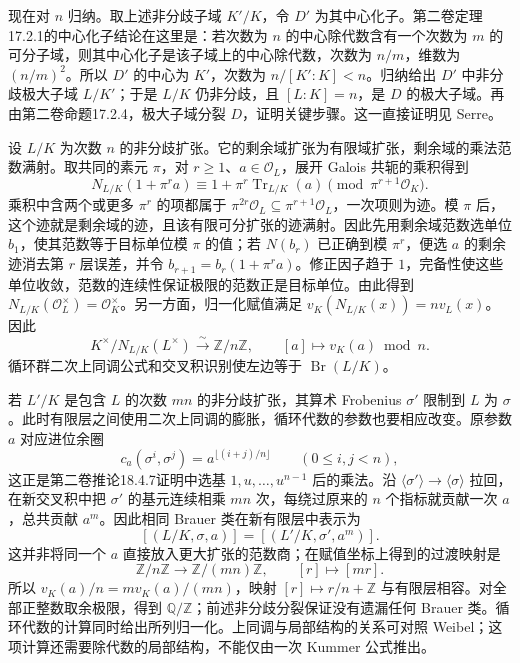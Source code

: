 \begin{proofsketch}
	现在对 \(n\) 归纳。取上述非分歧子域 \(K'/K\)，令 \(D'\) 为其中心化子。第二卷定理17.2.1的中心化子结论在这里是：若次数为 \(n\) 的中心除代数含有一个次数为 \(m\) 的可分子域，则其中心化子是该子域上的中心除代数，次数为 \(n/m\)，维数为 \((n/m)^2\)。所以 \(D'\) 的中心为 \(K'\)，次数为 \(n/[K':K]<n\)。归纳给出 \(D'\) 中非分歧极大子域 \(L/K'\)；于是 \(L/K\) 仍非分歧，且 \([L:K]=n\)，是 \(D\) 的极大子域。再由第二卷命题17.2.4，极大子域分裂 \(D\)，证明关键步骤。这一直接证明见 Serre\cite[Chapter XII, Section 2, Proposition 1, Lemma 1 and Proposition 2, pp. 182--184]{Serre1979LocalFields}。

	设 \(L/K\) 为次数 \(n\) 的非分歧扩张。它的剩余域扩张为有限域扩张，剩余域的乘法范数满射。取共同的素元 \(\pi\)，对 \(r\ge1\)、\(a\in\mathcal O_L\)，展开 Galois 共轭的乘积得到
	\[
		N_{L/K}(1+\pi^r a) \equiv1+\pi^r\operatorname{Tr}_{L/K}(a) \pmod{\pi^{r+1}\mathcal O_K}.
	\]
	乘积中含两个或更多 \(\pi^r\) 的项都属于 \(\pi^{2r}\mathcal O_L\subseteq\pi^{r+1}\mathcal O_L\)，一次项则为迹。模 \(\pi\) 后，这个迹就是剩余域的迹，且该有限可分扩张的迹满射。因此先用剩余域范数选单位 \(b_1\)，使其范数等于目标单位模 \(\pi\) 的值；若 \(N(b_r)\) 已正确到模 \(\pi^r\)，便选 \(a\) 的剩余迹消去第 \(r\) 层误差，并令 \(b_{r+1}=b_r(1+\pi^r a)\)。修正因子趋于 \(1\)，完备性使这些单位收敛，范数的连续性保证极限的范数正是目标单位。由此得到 \(N_{L/K}(\mathcal O_L^\times)=\mathcal O_K^\times\)。另一方面，归一化赋值满足 \(v_K(N_{L/K}(x))=nv_L(x)\)。因此
	\[
		K^\times/N_{L/K}(L^\times)\xrightarrow{\sim}\mathbb Z/n\mathbb Z, \qquad [a]\longmapsto v_K(a)\bmod n.
	\]
	循环群二次上同调公式和交叉积识别使左边等于 \(\operatorname{Br}(L/K)\)。

	若 \(L'/K\) 是包含 \(L\) 的次数 \(mn\) 的非分歧扩张，其算术 Frobenius \(\sigma'\) 限制到 \(L\) 为 \(\sigma\)。此时有限层之间使用二次上同调的膨胀，循环代数的参数也要相应改变。原参数 \(a\) 对应进位余圈
	\[
		c_a(\sigma^i,\sigma^j)=a^{\lfloor(i+j)/n\rfloor} \qquad(0\le i,j<n),
	\]
	这正是第二卷推论18.4.7证明中选基 \(1,u,\ldots,u^{n-1}\) 后的乘法。沿 \(\langle\sigma'\rangle\to\langle\sigma\rangle\) 拉回，在新交叉积中把 \(\sigma'\) 的基元连续相乘 \(mn\) 次，每绕过原来的 \(n\) 个指标就贡献一次 \(a\)，总共贡献 \(a^m\)。因此相同 Brauer 类在新有限层中表示为
	\[
		[(L/K,\sigma,a)]=[(L'/K,\sigma',a^m)].
	\]
	这并非将同一个 \(a\) 直接放入更大扩张的范数商；在赋值坐标上得到的过渡映射是
	\[
		\mathbb Z/n\mathbb Z\longrightarrow\mathbb Z/(mn)\mathbb Z, \qquad[r]\longmapsto[mr].
	\]
	所以 \(v_K(a)/n=mv_K(a)/(mn)\)，映射 \([r]\mapsto r/n+\mathbb Z\) 与有限层相容。对全部正整数取余极限，得到 \(\mathbb Q/\mathbb Z\)；前述非分歧分裂保证没有遗漏任何 Brauer 类。循环代数的计算同时给出所列归一化。上同调与局部结构的关系可对照 Weibel\cite[Sections 6.11.17--6.11.19, pp. 214--215]{Weibel1994HomologicalAlgebra}；这项计算还需要除代数的局部结构，不能仅由一次 Kummer 公式推出。
\end{proofsketch}

